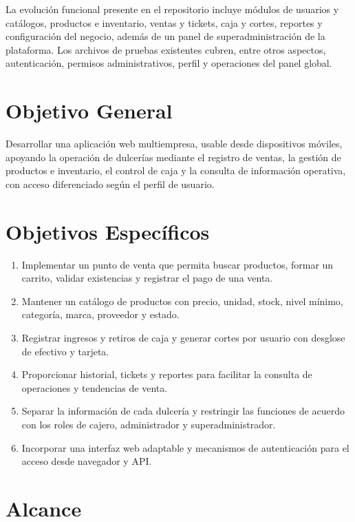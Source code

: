 La evolución funcional presente en el repositorio incluye módulos de usuarios y catálogos, productos e inventario, ventas y tickets, caja y cortes, reportes y configuración del negocio, además de un panel de superadministración de la plataforma. Los archivos de pruebas existentes cubren, entre otros aspectos, autenticación, permisos administrativos, perfil y operaciones del panel global.

\section{Objetivo General}

Desarrollar una aplicación web multiempresa, usable desde dispositivos móviles, apoyando la operación de dulcerías mediante el registro de ventas, la gestión de productos e inventario, el control de caja y la consulta de información operativa, con acceso diferenciado según el perfil de usuario.

\section{Objetivos Específicos}

\begin{enumerate}
  \item Implementar un punto de venta que permita buscar productos, formar un carrito, validar existencias y registrar el pago de una venta.
  \item Mantener un catálogo de productos con precio, unidad, stock, nivel mínimo, categoría, marca, proveedor y estado.
  \item Registrar ingresos y retiros de caja y generar cortes por usuario con desglose de efectivo y tarjeta.
  \item Proporcionar historial, tickets y reportes para facilitar la consulta de operaciones y tendencias de venta.
  \item Separar la información de cada dulcería y restringir las funciones de acuerdo con los roles de cajero, administrador y superadministrador.
  \item Incorporar una interfaz web adaptable y mecanismos de autenticación para el acceso desde navegador y API.
\end{enumerate}

\section{Alcance}

